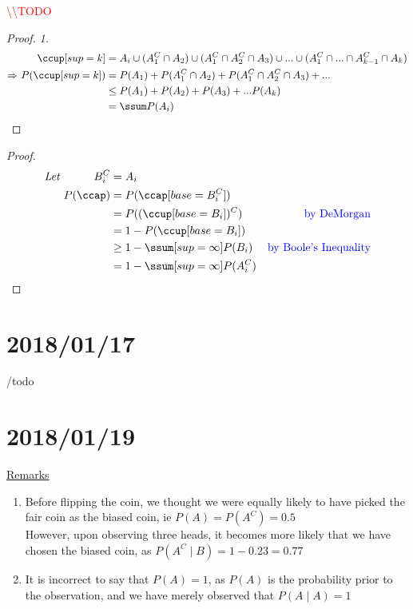 \documentclass[12pt]{article}
\newcommand{\mathcomment}[0]{\quad\color{blue}}
\newenvironment{remarks}{\underline{Remarks}\par}{}
\newcommand{\todo}[0]{\textcolor{red}{\textbackslash\textbackslash TODO}}
\begin{document}
\todo

\begin{proof} \textit{1.}
	\begin{equation}
		\begin{alignedat}{2}
			&& \ccup[sup=k] &= A_i \cup (A^C_1 \cap A_2) \cup (A^C_1 \cap A^C_2 \cap A_3) \cup ... \cup (A^C_1 \cap ... \cap A^C_{k-1} \cap A_k) \\
			\Rightarrow \ && P(\ccup[sup=k]) &= P(A_1) + P(A^C_1 \cap A_2) + P(A^C_1 \cap A^C_2 \cap A_3) + ... \\
			&&& \le P(A_1) + P(A_2) + P(A_3) + ... P(A_k) \\
			&&&= \ssum P(A_i)
		\end{alignedat}
	\end{equation}
\end{proof}

\begin{proof}
	\begin{equation}
		\begin{alignedat}{3}
		\textit{Let } && B^C_i &= A_i &\\
		&& P(\ccap) &= P(\ccap[base=B^C_i]) &\\
		&& &= P((\ccup[base=B_i])^C) & \mathcomment \text{by DeMorgan} \\
		&& &= 1 - P(\ccup[base=B_i]) &\\
		&& & \ge 1 - \ssum[sup=\infty] P(B_i) & \mathcomment \text{by Boole's Inequality} \\
		&& &= 1 - \ssum[sup=\infty]P(A^C_i)
		\end{alignedat}
	\end{equation}
\end{proof}

\section{2018/01/17}

/todo

\section{2018/01/19}

\begin{remarks}
	\begin{enumerate}
		\item Before flipping the coin, we thought we were equally likely to have picked the fair coin as the biased coin, ie $P(A) = P(A^C) = 0.5$ \\
		However, upon observing three heads, it becomes more likely that we have chosen the biased coin, as $P(A^C \mid B) = 1 - 0.23 = 0.77$
		
		\item It is incorrect to say that $P(A) = 1$, as $P(A)$ is the probability prior to the observation, and we have merely observed that $P(A \mid A) = 1$
	\end{enumerate}
\end{remarks}
\end{document}
